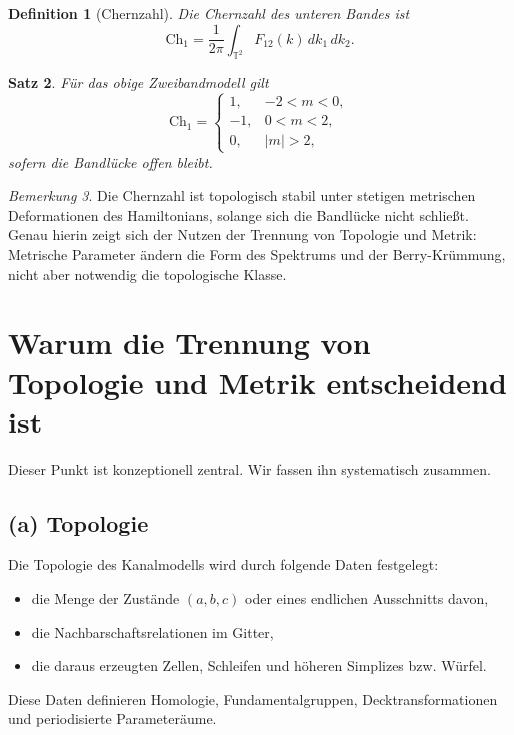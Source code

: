 \documentclass[11pt,a4paper]{article}
\newtheorem{definition}{Definition}[section]
\newtheorem{satz}[definition]{Satz}
\theoremstyle{remark}
\newtheorem{bemerkung}[definition]{Bemerkung}
\newcommand{\T}{\mathbb{T}}
\begin{document}
	\begin{definition}[Chernzahl]
		Die Chernzahl des unteren Bandes ist
		\begin{equation}
			\mathrm{Ch}_1 = \frac{1}{2\pi}\int_{\T^2}F_{12}(k)\,dk_1\,dk_2.
		\end{equation}
	\end{definition}
	
	\begin{satz}
		Für das obige Zweibandmodell gilt
		\begin{equation}
			\mathrm{Ch}_1=
			\begin{cases}
				1,& -2<m<0,\\
				-1,& 0<m<2,\\
				0,& |m|>2,
			\end{cases}
		\end{equation}
		sofern die Bandlücke offen bleibt.
	\end{satz}
	
	\begin{bemerkung}
		Die Chernzahl ist topologisch stabil unter stetigen metrischen Deformationen des Hamiltonians, solange sich die Bandlücke nicht schließt. Genau hierin zeigt sich der Nutzen der Trennung von Topologie und Metrik: Metrische Parameter ändern die Form des Spektrums und der Berry-Krümmung, nicht aber notwendig die topologische Klasse.
	\end{bemerkung}
	
	\section{Warum die Trennung von Topologie und Metrik entscheidend ist}
	
	Dieser Punkt ist konzeptionell zentral. Wir fassen ihn systematisch zusammen.
	
	\subsection*{(a) Topologie}
	Die Topologie des Kanalmodells wird durch folgende Daten festgelegt:
	\begin{itemize}
		\item die Menge der Zustände $(a,b,c)$ oder eines endlichen Ausschnitts davon,
		\item die Nachbarschaftsrelationen im Gitter,
		\item die daraus erzeugten Zellen, Schleifen und höheren Simplizes bzw. Würfel.
	\end{itemize}
	Diese Daten definieren Homologie, Fundamentalgruppen, Decktransformationen und periodisierte Parameteräume.
	
\end{document}
